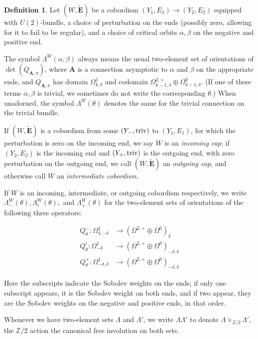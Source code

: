 \documentclass[10pt,a4paper]{amsart}
\theoremstyle{definition}
\newtheorem{definition}[theorem]{Definition}
\theoremstyle{remark}
\numberwithin{figure}{qchap}
\begin{document}
\begin{definition}Let $(W,\widetilde{\mathbf{E}})$ be a cobordism $(Y_1, E_1) \to (Y_2, E_2)$ equipped with $U(2)$-bundle, a choice of perturbation on the ends (possibly zero, allowing for it to fail to be regular), and a choice of critical orbits $\alpha, \beta$ on the negative and positive end.

The symbol $\Lambda^W(\alpha, \beta)$ always means the usual two-element set of orientations of $\det(Q_{\mathbf{A},\pi})$, where $\mathbf{A}$ is a connection asymptotic to $\alpha$ and $\beta$ on the appropriate ends, and $Q_{\mathbf{A},\pi}$ has domain $\Omega^1_{k,\delta}$ and codomain $\Omega^{2,+}_{k-1,\delta} \oplus \Omega^0_{k-1,\delta}$. (If one of these terms $\alpha, \beta$ is trivial, we sometimes do not write the corresponding $\theta$.) When unadorned, the symbol $\Lambda^W(\theta)$ denotes the same for the trivial connection on the trivial bundle.

If $(W,\widetilde{\mathbf{E}})$ is a cobordism from some $(Y_-, \textup{triv})$ to $(Y_1, E_1)$, for which the perturbation is zero on the incoming end, we say $W$ is an \emph{incoming cap}; if $(Y_2, E_2)$ is the incoming end and $(Y_+, \textup{triv})$ is the outgoing end, with zero perturbation on the outgoing end, we call $(W,\widetilde{\mathbf{E}})$ an \emph{outgoing cap}, and otherwise call $W$ an \emph{intermediate cobordism}.

If $W$ is an incoming, intermediate, or outgoing cobordism respectively, we write $\Lambda^W_-(\theta), \Lambda_i^W(\theta), $ and $\Lambda^W_+(\theta)$ for the two-element sets of orientations of the following three operators:

\begin{align*}Q^-_{\theta}: \Omega^1_{\delta, -\delta} &\to (\Omega^{2,+} \oplus \Omega^{0})_{\delta}\\
Q^i_\theta: \Omega^1_{-\delta} &\to (\Omega^{2,+} \oplus \Omega^{0})_{-\delta, \delta}\\
Q^+_\theta: \Omega^1_{-\delta,\delta} &\to (\Omega^{2,+} \oplus \Omega^0)_{-\delta, \delta}\end{align*}

Here the subscripts indicate the Sobolev weights on the ends; if only one subscript appears, it is the Sobolev weight on both ends, and if two appear, they are the Sobolev weights on the negative and positive ends, in that order.

Whenever we have two-element sets $\Lambda$ and $\Lambda'$, we write $\Lambda \Lambda'$ to denote $\Lambda \times_{\mathbb Z/2} \Lambda'$, the $\mathbb Z/2$ action the canonical free involution on both sets.
\end{definition}
\end{document}
